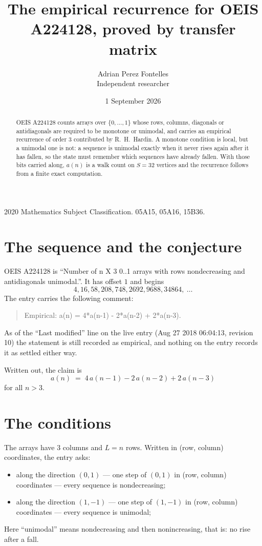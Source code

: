 \documentclass[11pt,a4paper]{article}
\title{The empirical recurrence for OEIS A224128, proved by transfer matrix}
\author{Adrian Perez Fontelles\\ \small Independent researcher}
\date{1 September 2026}
\theoremstyle{plain}
\theoremstyle{definition}
\begin{document}
\maketitle

\begin{abstract}
OEIS A224128 counts arrays over $\{0,\dots,1\}$ whose rows, columns, diagonals or
antidiagonals are required to be monotone or unimodal, and carries an empirical recurrence of
order $3$ contributed by R.~H.~Hardin. A monotone condition is local, but a unimodal one
is not: a sequence is unimodal exactly when it never rises again after it has fallen, so the
state must remember which sequences have already fallen. With those bits carried along, $a(n)$
is a walk count on $S=32$ vertices and the recurrence follows from a finite exact
computation.
\end{abstract}

\noindent\small 2020 Mathematics Subject Classification. 05A15, 05A16, 15B36.\normalsize

\section{The sequence and the conjecture}

OEIS A224128 is ``Number of n X 3 0..1 arrays with rows nondecreasing and antidiagonals unimodal.''. It has offset $1$ and begins
\[
4, 16, 58, 208, 748, 2692, 9688, 34864,\ \dots
\]
The entry carries the following comment:
\begin{quote}\small
Empirical: a(n) = 4*a(n-1) - 2*a(n-2) + 2*a(n-3).
\end{quote}
As of the ``Last modified'' line on the live entry (Aug 27 2018 06:04:13, revision 10) the statement is
still recorded as empirical, and nothing on the entry records it as settled either way.

Written out, the claim is
\begin{equation}\label{eq:conj}
a(n)\;=\;4\,a(n-1) - 2\,a(n-2) + 2\,a(n-3)
\end{equation}
for all $n>3$.

\section{The conditions}

The arrays have $3$ columns and $L=n$ rows. Written in (row, column)
coordinates, the entry asks:
\begin{itemize}
\item along the direction $(0,1)$ --- one step of $(0,1)$ in (row, column) coordinates --- every sequence is nondecreasing;
\item along the direction $(1,-1)$ --- one step of $(1,-1)$ in (row, column) coordinates --- every sequence is unimodal;
\end{itemize}
Here ``unimodal'' means nondecreasing and then nonincreasing, that is: no rise after a fall.
\end{document}
